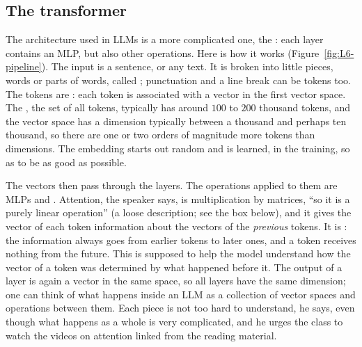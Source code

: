 \subsection{The transformer}\label{sec:L6-transformer}
The architecture used in LLMs is a more complicated one, the : each layer contains an MLP, but also other operations. Here is how it works (Figure~\ref{fig:L6-pipeline}). The input is a sentence, or any text. It is broken into little pieces, words or parts of words, called ; punctuation and a line break can be tokens too. The tokens are : each token is associated with a vector in the first vector space. The , the set of all tokens, typically has around $100$ to $200$ thousand tokens, and the vector space has a dimension typically between a thousand and perhaps ten thousand, so there are one or two orders of magnitude more tokens than dimensions. The embedding starts out random and is learned, in the training, so as to be as good as possible.

The vectors then pass through the layers. The operations applied to them are MLPs and . Attention, the speaker says, is multiplication by matrices, ``so it is a purely linear operation'' (a loose description; see the box below), and it gives the vector of each token information about the vectors of the \emph{previous} tokens. It is : the information always goes from earlier tokens to later ones, and a token receives nothing from the future. This is supposed to help the model understand how the vector of a token was determined by what happened before it. The output of a layer is again a vector in the same space, so all layers have the same dimension; one can think of what happens inside an LLM as a collection of vector spaces and operations between them. Each piece is not too hard to understand, he says, even though what happens as a whole is very complicated, and he urges the class to watch the videos on attention linked from the reading material.

